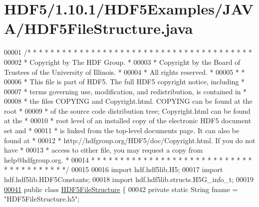 \hypertarget{_h_d_f5_21_810_81_2_h_d_f5_examples_2_j_a_v_a_2_h_d_f5_file_structure_8java_source}{}\section{H\+D\+F5/1.10.1/\+H\+D\+F5\+Examples/\+J\+A\+V\+A/\+H\+D\+F5\+File\+Structure.java}
\label{_h_d_f5_21_810_81_2_h_d_f5_examples_2_j_a_v_a_2_h_d_f5_file_structure_8java_source}

\begin{DoxyCode}
00001 \textcolor{comment}{/* * * * * * * * * * * * * * * * * * * * * * * * * * * * * * * * * * * * * * *}
00002 \textcolor{comment}{ * Copyright by The HDF Group.                                               *}
00003 \textcolor{comment}{ * Copyright by the Board of Trustees of the University of Illinois.         *}
00004 \textcolor{comment}{ * All rights reserved.                                                      *}
00005 \textcolor{comment}{ *                                                                           *}
00006 \textcolor{comment}{ * This file is part of HDF5.  The full HDF5 copyright notice, including     *}
00007 \textcolor{comment}{ * terms governing use, modification, and redistribution, is contained in    *}
00008 \textcolor{comment}{ * the files COPYING and Copyright.html.  COPYING can be found at the root   *}
00009 \textcolor{comment}{ * of the source code distribution tree; Copyright.html can be found at the  *}
00010 \textcolor{comment}{ * root level of an installed copy of the electronic HDF5 document set and   *}
00011 \textcolor{comment}{ * is linked from the top-level documents page.  It can also be found at     *}
00012 \textcolor{comment}{ * http://hdfgroup.org/HDF5/doc/Copyright.html.  If you do not have          *}
00013 \textcolor{comment}{ * access to either file, you may request a copy from help@hdfgroup.org.     *}
00014 \textcolor{comment}{ * * * * * * * * * * * * * * * * * * * * * * * * * * * * * * * * * * * * * * */}
00015 
00016 \textcolor{keyword}{import} hdf.hdf5lib.H5;
00017 \textcolor{keyword}{import} hdf.hdf5lib.HDF5Constants;
00018 \textcolor{keyword}{import} hdf.hdf5lib.structs.H5G\_info\_t;
00019 
\hyperlink{class_h_d_f5_file_structure}{00041} \textcolor{keyword}{public} \textcolor{keyword}{class }\hyperlink{class_h_d_f5_file_structure}{HDF5FileStructure} \{
00042     \textcolor{keyword}{private} \textcolor{keyword}{static} String fname  = \textcolor{stringliteral}{"HDF5FileStructure.h5"};

\end{DoxyCode}
